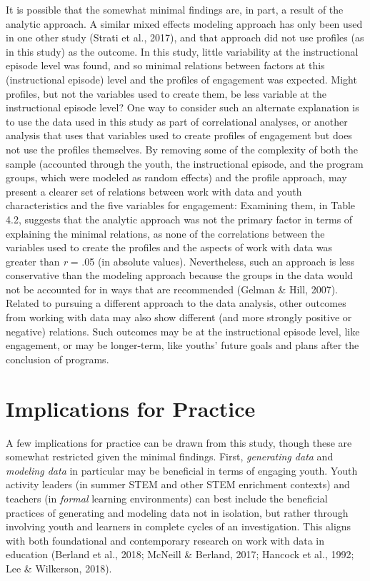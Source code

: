 \documentclass[]{msu-thesis}
\theoremstyle{definition}
\theoremstyle{definition}
\theoremstyle{definition}
\theoremstyle{remark}
\begin{document}
It is possible that the somewhat minimal findings are, in part, a result
of the analytic approach. A similar mixed effects modeling approach has
only been used in one other study (Strati et al., 2017), and that
approach did not use profiles (as in this study) as the outcome. In this
study, little variability at the instructional episode level was found,
and so minimal relations between factors at this (instructional episode)
level and the profiles of engagement was expected. Might profiles, but
not the variables used to create them, be less variable at the
instructional episode level? One way to consider such an alternate
explanation is to use the data used in this study as part of
correlational analyses, or another analysis that uses that variables
used to create profiles of engagement but does not use the profiles
themselves. By removing some of the complexity of both the sample
(accounted through the youth, the instructional episode, and the program
groups, which were modeled as random effects) and the profile approach,
may present a clearer set of relations between work with data and youth
characteristics and the five variables for engagement: Examining them,
in Table 4.2, suggests that the analytic approach was not the primary
factor in terms of explaining the minimal relations, as none of the
correlations between the variables used to create the profiles and the
aspects of work with data was greater than \emph{r} = .05 (in absolute
values). Nevertheless, such an approach is less conservative than the
modeling approach because the groups in the data would not be accounted
for in ways that are recommended (Gelman \& Hill, 2007). Related to
pursuing a different approach to the data analysis, other outcomes from
working with data may also show different (and more strongly positive or
negative) relations. Such outcomes may be at the instructional episode
level, like engagement, or may be longer-term, like youths' future goals
and plans after the conclusion of programs.

\section{Implications for Practice}\label{implications-for-practice}

A few implications for practice can be drawn from this study, though
these are somewhat restricted given the minimal findings. First,
\emph{generating data} and \emph{modeling data} in particular may be
beneficial in terms of engaging youth. Youth activity leaders (in summer
STEM and other STEM enrichment contexts) and teachers (in \emph{formal}
learning environments) can best include the beneficial practices of
generating and modeling data not in isolation, but rather through
involving youth and learners in complete cycles of an investigation.
This aligns with both foundational and contemporary research on work
with data in education (Berland et al., 2018; McNeill \& Berland, 2017;
Hancock et al., 1992; Lee \& Wilkerson, 2018).
\end{document}
